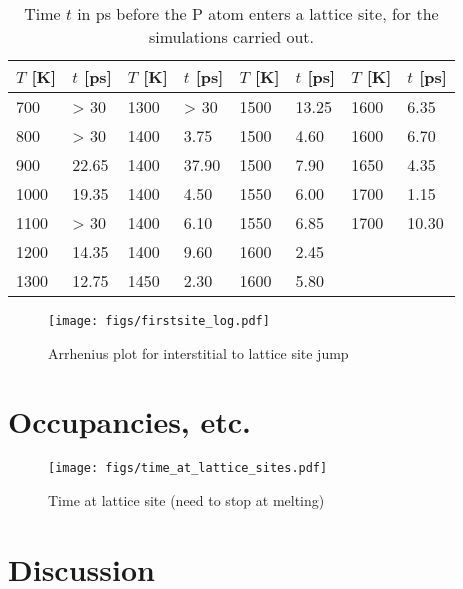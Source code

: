 \documentclass[11pt,bibliography=totoc,index=totoc]{scrbook}   %
\begin{document}
\clearpage
\begin{table}[htbp]
  \centering
  \begin{tabular}{llllllll}\toprule
      $T$ [K] & $t$ [ps] &
      $T$ [K] & $t$ [ps] &
      $T$ [K] & $t$ [ps] &
      $T$ [K] & $t$ [ps] \\\midrule
        700 & > 30 & 1300 & > 30 & 1500 & 13.25 & 1600 & 6.35\\
        800 & > 30 & 1400 & 3.75 & 1500 & 4.60 & 1600 & 6.70\\
        900 & 22.65 & 1400 & 37.90 & 1500 & 7.90 & 1650 & 4.35\\
        1000 & 19.35 & 1400 & 4.50 & 1550 & 6.00 & 1700 & 1.15\\
        1100 & > 30 & 1400 & 6.10 & 1550 & 6.85 & 1700 & 10.30\\
        1200 & 14.35 & 1400 & 9.60 & 1600 & 2.45 &  & \\
        1300 & 12.75 & 1450 & 2.30 & 1600 & 5.80 &  & \\
    \bottomrule
  \end{tabular}
  \caption{Time $t$ in ps before the P atom enters a lattice site, for the simulations carried out.}
  \label{tab:interstitial-to-substitutional}
\end{table}


\begin{figure}[htbp]
  \centering
  \texttt{[image: figs/firstsite\_log.pdf]}
  \caption{Arrhenius plot for interstitial to lattice site jump}
  \label{fig:interstitial-to-substitutional}
\end{figure}


%
\section{Occupancies, etc.}
%

\begin{figure}[htbp]
  \centering
  \texttt{[image: figs/time\_at\_lattice\_sites.pdf]}
  \caption{Time at lattice site (need to stop at melting)}
  \label{fig:timelattsite}
\end{figure}


%
\section{Discussion}
%
\end{document}
